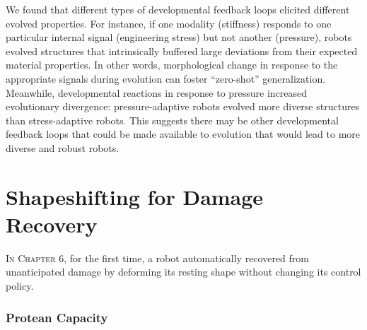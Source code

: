 We found that different types of developmental feedback loops elicited different evolved properties.
For instance, if one modality (stiffness) responds to one particular internal signal (engineering stress) but not another (pressure), robots evolved structures that intrinsically buffered large deviations from their expected material properties.
In other words, morphological change in response to the appropriate signals during evolution can foster ``zero-shot'' generalization.
Meanwhile, developmental reactions in response to pressure increased evolutionary divergence: 
pressure-adaptive robots evolved more diverse 
structures than stress-adaptive robots.
This suggests
there may be other developmental feedback loops that could be made available to evolution
that would lead to more diverse and robust robots.





\section{Shapeshifting for Damage Recovery}


\textsc{In Chapter 6,}
for the first time, a robot automatically recovered from unanticipated damage by deforming its resting shape without changing its control policy.

\subsubsection*{Protean Capacity}

